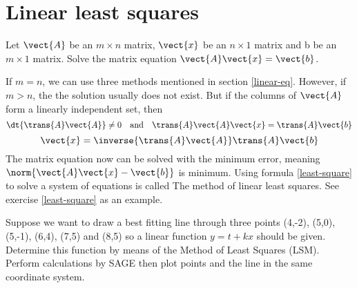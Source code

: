 \section{Linear least squares}
Let $\vect{A}$ be an $m\times n$ matrix, $\vect{x}$ be an $n\times 1$ matrix and b be an $m\times 1$ matrix. Solve the matrix equation $\vect{A}\vect{x}=\vect{b}$.\par 
If $m=n$, we can use three methods mentioned in section \ref{linear-eq}. However, if $m>n$, the the solution usually does not exist. But if the columns of $\vect{A}$ form a linearly independent set, then 
\begin{equation}
\dt{\trans{A}\vect{A}}\neq 0 \quad \text{and} \quad \trans{A}\vect{A}\vect{x}=\trans{A}\vect{b}
\end{equation}
\begin{equation}\label{least-square}
\vect{x}=\inverse{\trans{A}\vect{A}}\trans{A}\vect{b}
\end{equation}
The matrix equation now can be solved with the minimum error, meaning $\norm{\vect{A}\vect{x}-\vect{b}}$ is minimum. Using formula \eqref{least-square} to solve a system of equations is called The method of linear least squares. See exercise \ref{least-square} as an example.
\begin{exercise}
Suppose we want to draw a best fitting line through three points (4,-2), (5,0), (5,-1), (6,4), (7,5) and (8,5) so a linear function $y=t+kx$ should be given. Determine this function by means of the Method of Least Squares (LSM). Perform calculations by SAGE then plot points and the line in the same coordinate system.
\end{exercise}

